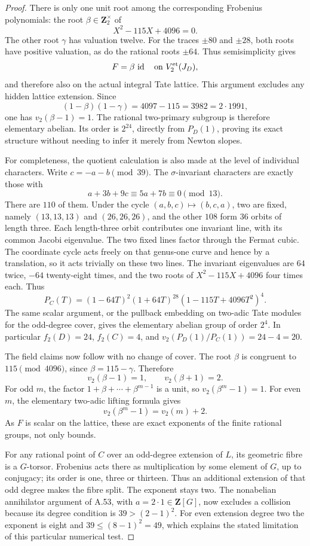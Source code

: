 \documentclass[11pt]{article}
\begin{document}
\begin{proof}
There is only one unit root among the corresponding
Frobenius polynomials: the root \(\beta\in\mathbf Z_2^\times\) of
\[
                       X^2-115X+4096=0.
\]
The other root \(\gamma\) has valuation twelve.
For the traces \(\pm80\) and \(\pm28\), both roots
have positive valuation, as do the rational roots
\(\pm64\). Thus semisimplicity gives
\[
               F=\beta\,\operatorname{id}
               \quad\text{on }V_2^{\rm et}(J_D),
\]
and therefore also on the actual integral Tate lattice.
This argument excludes any hidden lattice extension.
Since
\[
 (1-\beta)(1-\gamma)=4097-115=3982=2\cdot1991,
\]
one has \(v_2(\beta-1)=1\). The rational two-primary
subgroup is therefore elementary abelian. Its order is
\(2^{24}\), directly from \(P_D(1)\), proving its exact
structure without needing to infer it merely from
Newton slopes.

For completeness, the quotient calculation is also made
at the level of individual characters. Write
\(c=-a-b\pmod{39}\). The \(\sigma\)-invariant characters
are exactly those with
\[
                    a+3b+9c\equiv5a+7b\equiv0\pmod{13}.
\]
There are \(110\) of them. Under the cycle
\((a,b,c)\mapsto(b,c,a)\), two are fixed,
namely \((13,13,13)\) and \((26,26,26)\), and the
other \(108\) form \(36\) orbits of length three.
Each length-three orbit contributes one invariant line,
with its common Jacobi eigenvalue. The two fixed lines
factor through the Fermat cubic. The coordinate cycle
acts freely on that genus-one curve and hence by a
translation, so it acts trivially on these two lines.
The invariant eigenvalues are \(64\) twice, \(-64\)
twenty-eight times, and the two roots of
\(X^2-115X+4096\) four times each. Thus
\[
        P_C(T)=(1-64T)^2(1+64T)^{28}
                           (1-115T+4096T^2)^4.
\]
The same scalar argument, or the pullback embedding
on two-adic Tate modules for the odd-degree cover,
gives the elementary abelian group of order \(2^4\).
In particular \(f_2(D)=24\), \(f_2(C)=4\), and
\(v_2(P_D(1)/P_C(1))=24-4=20\).

The field claims now follow with no change of cover.
The root \(\beta\) is congruent to \(115\pmod{4096}\),
since \(\beta=115-\gamma\). Therefore
\[
                   v_2(\beta-1)=1,\qquad
                   v_2(\beta+1)=2.
\]
For odd \(m\), the factor
\(1+\beta+\cdots+\beta^{m-1}\) is a unit, so
\(v_2(\beta^m-1)=1\). For even \(m\), the elementary
two-adic lifting formula gives
\[
                  v_2(\beta^m-1)=v_2(m)+2.
\]
As \(F\) is scalar on the lattice, these are exact
exponents of the finite rational groups, not only bounds.

For any rational point of \(C\) over an odd-degree
extension of \(L\), its geometric fibre is a \(G\)-torsor.
Frobenius acts there as multiplication by some element
of \(G\), up to conjugacy; its order is one, three or
thirteen. Thus an additional extension of that odd
degree makes the fibre split. The exponent stays two.
The nonabelian annihilator argument of A.53, with
\(a=2\cdot1\in\mathbf Z[G]\), now excludes a collision
because its degree condition is \(39>(2-1)^2\).
For even extension degree two the exponent is eight
and \(39\le(8-1)^2=49\), which explains the stated
limitation of this particular numerical test.
\end{proof}
\end{document}
